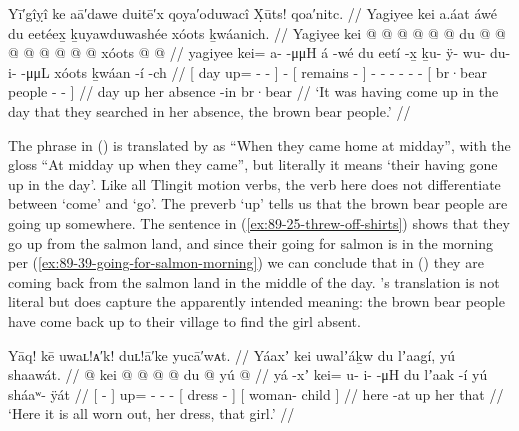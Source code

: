 \ex\label{ex:89-41-searched-for-her}%
%
\begingl
	\glpreamble	Yī′gîỵî ke aā′dawe duitē′x qoya′oduwacî X̣ūts! qoa′nitc. //
	\glpreamble	Yagiyee kei a.áat áwé du eetéex̱ ḵuyawduwashée xóots ḵwáanich. //
	\gla	{} Yagiyee kei @  @ {} @ {} @ {} @ {} {} 
		 @ {}
		{} du  @ {} {}
		 @ {} @ {} @ {} @ {} @ {} @ {} @ {} 
		{} xóots  @ {} @ {} {} //
	\glb	{} yagiyee kei= a- {}  -μμH {} {}
		á -wé
		{} du eetí -x̱ {}
		ḵu- ÿ- wu- du- {} i-  -μμL
		{} xóots ḵwáan -í -ch {} //
	\glc	{}[ day up= - \·  - \· {}]
		 -
		{}[  remains - {}]
		- - - - \· -  -
		{}[ br·bear people - - {}] //
	\gld	{} day up  {} {} {} {} {}
		 {}
		{} her absence -in {}
		 {} {} {} {} {} {} {}
		{} br·bear  {} {} {} //
	\glft	‘It was having come up in the day that they searched in her absence, the brown bear people.’
		//
\endgl
\xe

The phrase  in (\lastx) is translated by \citeauthor{swanton:1909} as “When they came home at midday”, with the gloss “At midday up when they came”, but literally it means ‘their having gone up in the day’.
Like all Tlingit motion verbs, the verb here does not differentiate between ‘come’ and ‘go’.
The preverb  ‘up’ tells us that the brown bear people are going up somewhere.
The sentence in (\ref{ex:89-25-threw-off-shirts}) shows that they go up from the salmon land, and since their going for salmon is in the morning per (\ref{ex:89-39-going-for-salmon-morning}) we can conclude that in (\lastx) they are coming back from the salmon land in the middle of the day.
\citeauthor{swanton:1909}’s translation is not literal but does capture the apparently intended meaning: the brown bear people have come back up to their village to find the girl absent.

\ex\label{ex:89-42-here-her-dress}%
%
\begingl
	\glpreamble	Yāq! kē uwaʟ!ᴀ′k! duʟ!ā′ke yucā′wᴀt. //
	\glpreamble	Yáaxʼ kei uwalʼáḵw du lʼaagí, yú shaawát. //
	\gla	{}  @ {} {}
		kei @  @ {} @ {} @ {}
		{} du  @ {} {}
		{} yú  @ {} {} //
	\glb	{} yá -xʼ {}
		kei= u- i-  -μH
		{} du lʼaak -í {}
		{} yú sháaʷ- ÿát {} //
	\glc	{}[  - {}]
		up= - -  -
		{}[  dress - {}]
		{}[  woman- child {}] //
	\gld	{} here -at {}
		up  {} {} {}
		{} her  {} {}
		{} that  {} {} //
	\glft	‘Here it is all worn out, her dress, that girl.’
		//
\endgl
\xe

